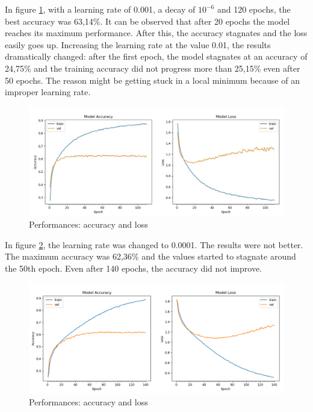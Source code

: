 \documentclass[runningheads,a4paper,12pt]{report}
\begin{document}
In figure \ref{fig:result1}, with a learning rate of 0.001, a decay of $10^{-6}$ and 120 epochs, the best accuracy was 63,14\%. It can be observed that after 20 epochs the model reaches its maximum performance. After this, the accuracy stagnates and the loss easily goes up. Increasing the learning rate at the value 0.01, the results dramatically changed: after the first epoch, the model stagnates at an accuracy of 24,75\% and the training accuracy did not progress more than 25,15\% even after 50 epochs. The reason might be getting stuck in a local minimum because of an improper learning rate. 

\begin{figure}[h]
	\centering
	\includegraphics[width=\linewidth]{./images/3_results1}\hfill	
	\caption{Performances: accuracy and loss}  
    \label{fig:result1}
\end{figure}

In figure \ref{fig:result2}, the learning rate was changed to 0.0001. The results were not better. The maximum accuracy was 62,36\% and the values started to stagnate around the 50th epoch. Even after 140 epochs, the accuracy did not improve.

\begin{figure}[h]
	\centering
	\includegraphics[width=\linewidth]{./images/3_results2}\hfill	
	\caption{Performances: accuracy and loss}  
    \label{fig:result2}
\end{figure}
\end{document}
